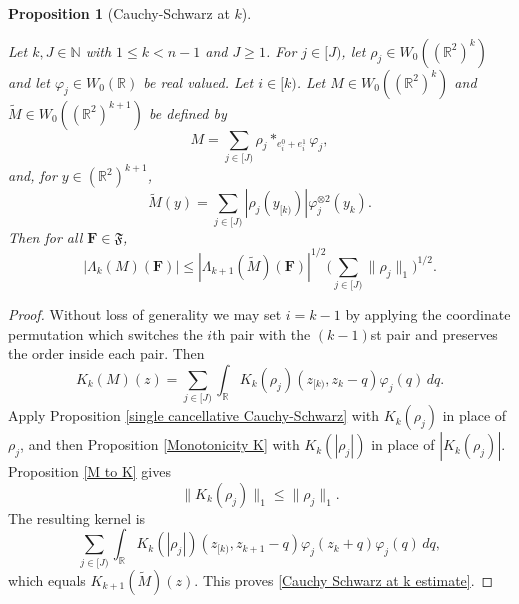 \documentclass[12pt,reqno]{amsart}
\theoremstyle{plain}
\newtheorem{proposition}[theorem]{Proposition}
\numberwithin{equation}{section}
\theoremstyle{remark}
\newcommand{\uses}[1]{}
\newcommand{\usesdefs}[1]{}
\newcommand{\leanok}{}
\newcommand{\lean}[1]{}
\newcommand{\R}{{\mathbb R}}
\newcommand{\N}{{\mathbb N}}
\newcommand{\F}{\mathbf{F}}
\begin{document}
\begin{proposition}[Cauchy-Schwarz at $k$]\label{Cauchy-Schwarz at k}\uses{single cancellative Cauchy-Schwarz,Monotonicity K,M to K}\usesdefs{auto:Wiener-space-definition,auto:convolution-along-vector-definition,normalized function tuples,auto:prism-form-definition}
\lean{Auto.cauchySchwarzKernel_memW0,Auto.cauchySchwarzLift_memW0,Auto.cauchySchwarzAtK_bound}
\leanok
Let $k,J\in\N$ with $1\le k<n-1$ and $J\ge1$. For $j\in[J)$, let $\rho_j\in W_0((\R^2)^k)$ and let $\varphi_j\in W_0(\R)$ be real valued. Let $i\in[k)$. Let $M\in W_0((\R^2)^k)$ and $\widetilde M\in W_0((\R^2)^{k+1})$ be defined by
\begin{equation}\label{before CS}
M=\sum_{j\in[J)}\rho_j*_{e_i^0+e_i^1}\varphi_j,
\end{equation}
and, for $y\in(\R^2)^{k+1}$,
\begin{equation}\label{Cauchy Schwarz tilde M definition}
\widetilde M(y)=\sum_{j\in[J)}|\rho_j(y_{[k)})|\varphi_j^{\otimes2}(y_k).
\end{equation}
Then for all $\F\in\mathfrak F$,
\begin{equation}\label{Cauchy Schwarz at k estimate}
|\Lambda_k(M)(\F)|
\le
|\Lambda_{k+1}(\widetilde M)(\F)|^{1/2}
\Big(\sum_{j\in[J)}\|\rho_j\|_1\Big)^{1/2}.
\end{equation}
\end{proposition}
\begin{proof}
Without loss of generality we may set $i=k-1$ by applying the coordinate permutation which switches the $i$th pair with the $(k-1)$st pair and preserves the order inside each pair. Then
\[
K_k(M)(z)
=
\sum_{j\in[J)}\int_\R K_k(\rho_j)(z_{[k)},z_k-q)\varphi_j(q)\,dq.
\]
Apply Proposition \ref{single cancellative Cauchy-Schwarz} with $K_k(\rho_j)$ in place of $\rho_j$, and then Proposition \ref{Monotonicity K} with $K_k(|\rho_j|)$ in place of $|K_k(\rho_j)|$. Proposition \ref{M to K} gives
\[
\|K_k(\rho_j)\|_1\le\|\rho_j\|_1.
\]
The resulting kernel is
\[
\sum_{j\in[J)}\int_\R
K_k(|\rho_j|)(z_{[k)},z_{k+1}-q)
\varphi_j(z_k+q)\varphi_j(q)\,dq,
\]
which equals $K_{k+1}(\widetilde M)(z)$. This proves \eqref{Cauchy Schwarz at k estimate}.
\end{proof}
\end{document}
